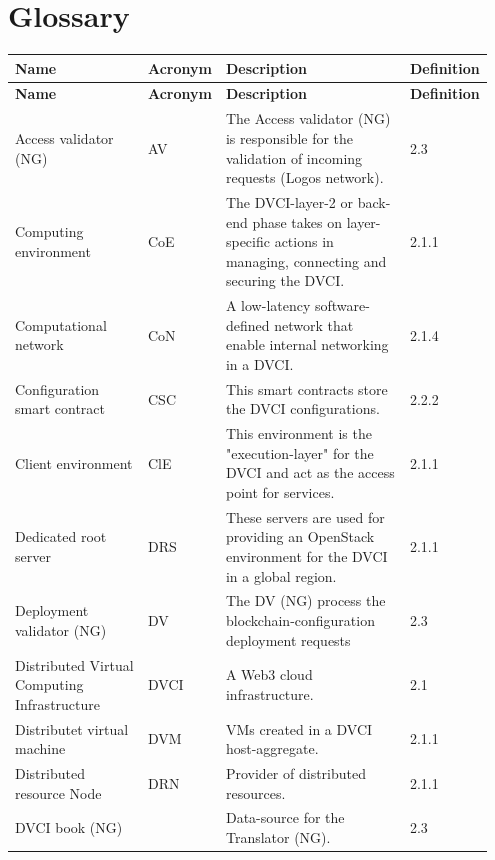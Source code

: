 \documentclass[]{article}
\begin{document}
\section*{Glossary}
\begin{longtable}{p{0.3\linewidth} p{0.1\linewidth} p{0.45\linewidth} p{0.1\linewidth}}
	\textbf{Name}&\textbf{Acronym}&\textbf{Description}&\textbf{Definition}\newline \\ \hline
	\endfirsthead
	\textbf{Name}&\textbf{Acronym}&\textbf{Description}&\textbf{Definition}\newline \\ \hline
	\endhead

Access validator (NG) & AV & The Access validator (NG) is responsible for the validation of incoming requests (Logos network). & 2.3 \\ %
Computing environment & CoE & The DVCI-layer-2 or back-end phase takes on layer-specific actions in managing, connecting and securing the DVCI. & 2.1.1 \\ %
Computational network & CoN & A low-latency software-defined network that enable internal networking in a DVCI. & 2.1.4 \\ %
Configuration smart contract & CSC & This smart contracts store the DVCI configurations. & 2.2.2 \\ %
Client environment & ClE & This environment is the "execution-layer" for the DVCI and act as the access point for services. & 2.1.1 \\ %
Dedicated root server & DRS & These servers are used for providing an OpenStack environment for the DVCI in a global region. & 2.1.1 \\ %
Deployment validator (NG) & DV & The DV (NG) process the blockchain-configuration deployment requests & 2.3 \\ %
Distributed Virtual \newline Computing Infrastructure & DVCI & A Web3 cloud infrastructure. & 2.1 \\ %
Distributet virtual machine & DVM & VMs created in a DVCI host-aggregate. & 2.1.1 \\ %
Distributed resource Node & DRN & Provider of distributed resources.  & 2.1.1 \\ %
DVCI book (NG) & & Data-source for the Translator (NG). & 2.3 \\ %

\end{longtable}
\end{document}
